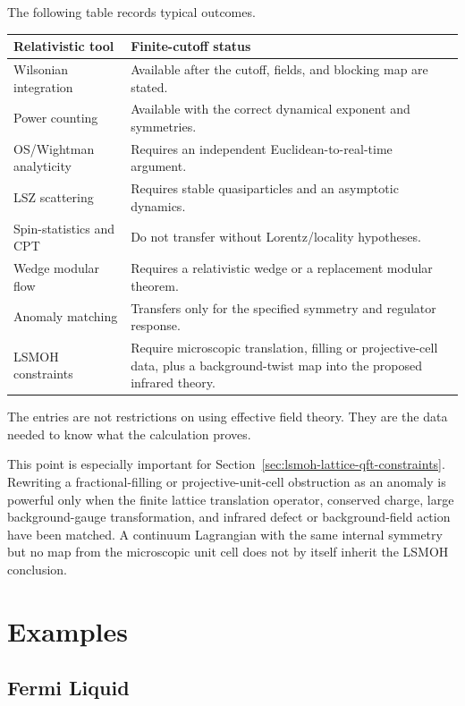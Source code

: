 The following table records typical outcomes.
\begin{center}
\small
\begin{tabular}{@{}p{}p{}@{}}
\hline
Relativistic tool & Finite-cutoff status\\
\hline
Wilsonian integration &
Available after the cutoff, fields, and blocking map are stated.\\
Power counting &
Available with the correct dynamical exponent and symmetries.\\
OS/Wightman analyticity &
Requires an independent Euclidean-to-real-time argument.\\
LSZ scattering &
Requires stable quasiparticles and an asymptotic dynamics.\\
Spin-statistics and CPT &
Do not transfer without Lorentz/locality hypotheses.\\
Wedge modular flow &
Requires a relativistic wedge or a replacement modular theorem.\\
Anomaly matching &
Transfers only for the specified symmetry and regulator response.\\
LSMOH constraints &
Require microscopic translation, filling or projective-cell data, plus a
background-twist map into the proposed infrared theory.\\
\hline
\end{tabular}
\end{center}
The entries are not restrictions on using effective field theory.  They are
the data needed to know what the calculation proves.

This point is especially important for
Section~\ref{sec:lsmoh-lattice-qft-constraints}.  Rewriting a fractional-filling
or projective-unit-cell obstruction as an anomaly is powerful only when the
finite lattice translation operator, conserved charge, large background-gauge
transformation, and infrared defect or background-field action have been
matched.  A continuum Lagrangian with the same internal symmetry but no map from
the microscopic unit cell does not by itself inherit the LSMOH conclusion.

\section{Examples}

\subsection{Fermi Liquid}

